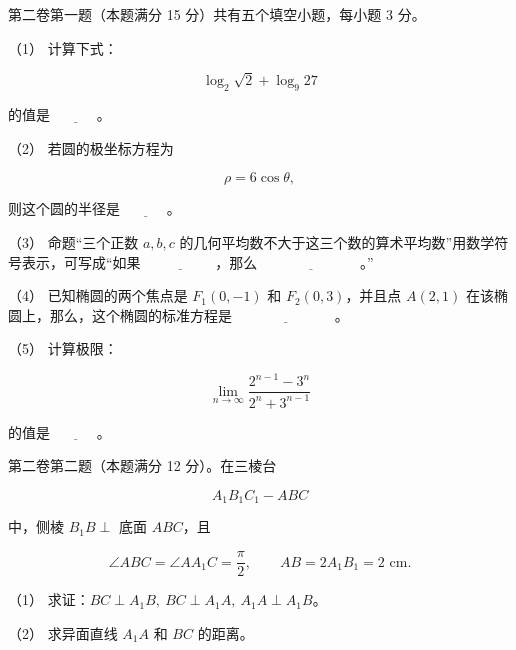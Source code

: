 \begin{question}

第二卷第一题（本题满分 15 分）共有五个填空小题，每小题 3 分。

（1） 计算下式：

\nopagebreak[4]
\[
\log_2\sqrt2+\log_9 27
\]

的值是 $\underline{\hspace{3em}}$。

（2） 若圆的极坐标方程为

\nopagebreak[4]
\[
\rho=6\cos\theta,
\]

则这个圆的半径是 $\underline{\hspace{3em}}$。

（3） 命题“三个正数 $a,b,c$ 的几何平均数不大于这三个数的算术平均数”用数学符号表示，可写成“如果 $\underline{\hspace{5em}}$，那么 $\underline{\hspace{7em}}$。”

（4） 已知椭圆的两个焦点是 $F_1(0,-1)$ 和 $F_2(0,3)$，并且点 $A(2,1)$ 在该椭圆上，那么，这个椭圆的标准方程是 $\underline{\hspace{7em}}$。

（5） 计算极限：

\nopagebreak[4]
\[
\lim_{n\to\infty}\frac{2^{n-1}-3^n}{2^n+3^{n-1}}
\]

的值是 $\underline{\hspace{3em}}$。

\Needspace{0.4\textheight}
\end{question}
\begin{question}

第二卷第二题（本题满分 12 分）。在三棱台

\nopagebreak[4]
\[
A_1B_1C_1-ABC
\]

中，侧棱 $B_1B\perp$ 底面 $ABC$，且

\nopagebreak[4]
\[
\angle ABC=\angle AA_1C=\frac\pi2,\qquad
AB=2A_1B_1=2\text{ cm}.
\]
\nopagebreak[4]
\begin{center}\end{center}
\nopagebreak[4]
（1） 求证：$BC\perp A_1B,\ BC\perp A_1A,\ A_1A\perp A_1B$。

（2） 求异面直线 $A_1A$ 和 $BC$ 的距离。

\end{question}
